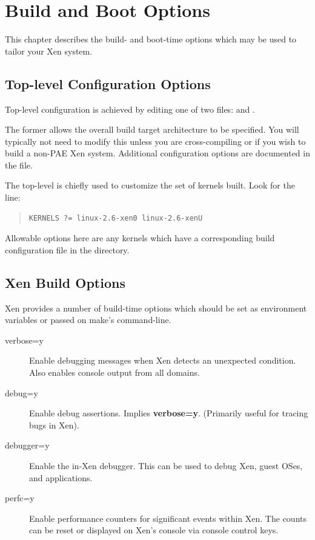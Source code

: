 \documentclass[11pt,twoside,final,openright]{report}
\begin{document}
\chapter{Build and Boot Options} 

This chapter describes the build- and boot-time options which may be
used to tailor your Xen system.

\section{Top-level Configuration Options} 

Top-level configuration is achieved by editing one of two 
files:  and . 

The former allows the overall build target architecture to be 
specified. You will typically not need to modify this unless 
you are cross-compiling or if you wish to build a non-PAE  
Xen system. Additional configuration options are documented 
in the  file. 

The top-level  is chiefly used to customize the set of
kernels built. Look for the line: 
\begin{quote}
\begin{verbatim}
KERNELS ?= linux-2.6-xen0 linux-2.6-xenU
\end{verbatim}
\end{quote}

Allowable options here are any kernels which have a corresponding 
build configuration file in the  directory. 



\section{Xen Build Options}

Xen provides a number of build-time options which should be set as
environment variables or passed on make's command-line.

\begin{description}
\item[verbose=y] Enable debugging messages when Xen detects an
  unexpected condition.  Also enables console output from all domains.
\item[debug=y] Enable debug assertions.  Implies {\bf verbose=y}.
  (Primarily useful for tracing bugs in Xen).
\item[debugger=y] Enable the in-Xen debugger. This can be used to
  debug Xen, guest OSes, and applications.
\item[perfc=y] Enable performance counters for significant events
  within Xen. The counts can be reset or displayed on Xen's console
  via console control keys.
\end{description}
\end{document}
